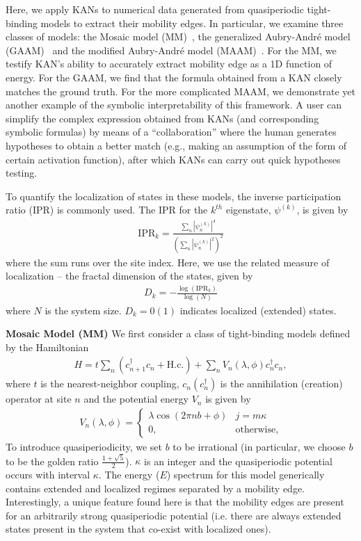 \documentclass{article}
\numberwithin{equation}{section}
\numberwithin{figure}{section}
\begin{document}
Here, we apply KANs to numerical data generated from quasiperiodic tight-binding models to extract their mobility edges. In particular, we examine three classes of models: the Mosaic model (MM)~\cite{ME_wang2020one}, the generalized Aubry-Andr\'e model (GAAM)~\cite{ME_ganeshan2015nearest} and the modified Aubry-Andr\'e model (MAAM)~\cite{ME_biddle2010predicted}. For the MM, we testify KAN's ability to accurately extract mobility edge as a 1D function of energy. For the GAAM, we find that the formula obtained from a KAN closely matches the ground truth. For the more complicated MAAM, we demonstrate yet another example of the symbolic interpretability of this framework. A user can simplify the complex expression obtained from KANs (and corresponding symbolic formulas) by means of a ``collaboration'' where the human generates hypotheses to obtain a better match (e.g., making an assumption of the form of certain activation function), after which KANs can carry out quick hypotheses testing.

To quantify the localization of states in these models, the inverse participation ratio (IPR) is commonly used. The IPR for the $k^{th}$ eigenstate, $\psi^{(k)}$, is given by
\begin{align}
    \text{IPR}_k = \frac{\sum_n |\psi^{(k)}_n|^4}{\left( \sum_n |\psi^{(k)}_n|^2\right)^2}
\end{align}
where the sum runs over the site index. Here, we use the related measure of localization -- the fractal dimension of the states, given by
\begin{align}
    D_k = -\frac{\log(\text{IPR}_k)}{\log(N)}
\end{align}
where $N$ is the system size. $D_k = 0 (1)$ indicates localized (extended) states.

{\bf Mosaic Model (MM)} We first consider a class of tight-binding models defined by the Hamiltonian~\cite{ME_wang2020one}
\begin{align}
    H = t\sum_n \left( c^\dag_{n+1} c_n + \text{H.c.}\right) + \sum_n V_n(\lambda, \phi) c^\dag_n c_n,
\end{align}
where $t$ is the nearest-neighbor coupling, $c_n (c^\dag_n)$ is the annihilation (creation) operator at site $n$ and the potential energy $V_n$ is given by
\begin{align}
    V_n(\lambda, \phi) = \begin{cases}
      \lambda\cos(2\pi nb + \phi) & j = m\kappa\\
      0, & \text{otherwise,}
    \end{cases}       
\end{align}
To introduce quasiperiodicity, we set $b$ to be irrational (in particular, we choose $b$ to be the golden ratio $\frac{1+\sqrt{5}}{2}$). $\kappa$ is an integer and the quasiperiodic potential occurs with interval $\kappa$. The energy ($E$) spectrum for this model generically contains extended and localized regimes separated by a mobility edge. Interestingly, a unique feature found here is that the mobility edges are present for an arbitrarily strong quasiperiodic potential (i.e. there are always extended states present in the system that co-exist with localized ones).
\end{document}
